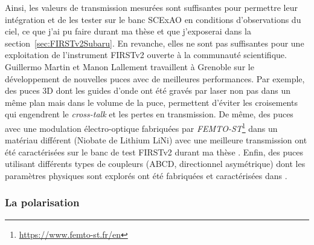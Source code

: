 Ainsi, les valeurs de transmission mesurées sont suffisantes pour permettre leur intégration et de les tester sur le banc \ac{SCExAO} en conditions d'observations du ciel, ce que j'ai pu faire durant ma thèse et que j'exposerai dans la section~\ref{sec:FIRSTv2Subaru}. En revanche, elles ne sont pas suffisantes pour une exploitation de l'instrument \ac{FIRSTv2} ouverte à la communauté scientifique. Guillermo Martin et Manon Lallement travaillent à Grenoble sur le développement de nouvelles puces avec de meilleures performances. Par exemple, des puces 3D \citep{martin2022a} dont les guides d'onde ont été gravés par laser non pas dans un même plan mais dans le volume de la puce, permettent d'éviter les croisements qui engendrent le \textit{cross-talk} et les pertes en transmission. De même, des puces avec une modulation électro-optique fabriquées par \textit{FEMTO-ST}\footnote{\url{https://www.femto-st.fr/en}} dans un matériau différent (Niobate de Lithium LiNi) avec une meilleure transmission ont été caractérisées sur le banc de test \ac{FIRSTv2} durant ma thèse \citep{martin2022b}. Enfin, des puces utilisant différents types de coupleurs (ABCD, directionnel asymétrique) dont les paramètres physiques sont explorés ont été fabriquées et caractérisées dans \cite{lallement2022}.


\subsubsection{La polarisation}

